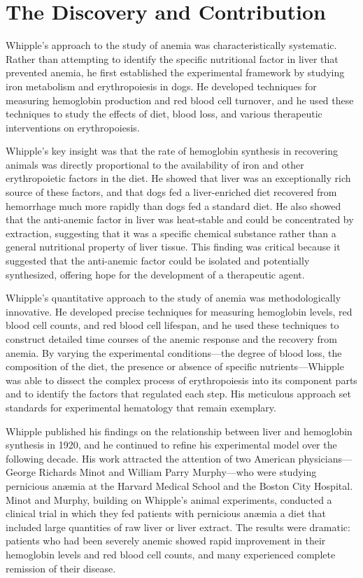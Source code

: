 \section{The Discovery and Contribution}

Whipple's approach to the study of anemia was characteristically systematic. Rather than attempting to identify the specific nutritional factor in liver that prevented anemia, he first established the experimental framework by studying iron metabolism and erythropoiesis in dogs. He developed techniques for measuring hemoglobin production and red blood cell turnover, and he used these techniques to study the effects of diet, blood loss, and various therapeutic interventions on erythropoiesis.

Whipple's key insight was that the rate of hemoglobin synthesis in recovering animals was directly proportional to the availability of iron and other erythropoietic factors in the diet. He showed that liver was an exceptionally rich source of these factors, and that dogs fed a liver-enriched diet recovered from hemorrhage much more rapidly than dogs fed a standard diet. He also showed that the anti-anemic factor in liver was heat-stable and could be concentrated by extraction, suggesting that it was a specific chemical substance rather than a general nutritional property of liver tissue. This finding was critical because it suggested that the anti-anemic factor could be isolated and potentially synthesized, offering hope for the development of a therapeutic agent.

Whipple's quantitative approach to the study of anemia was methodologically innovative. He developed precise techniques for measuring hemoglobin levels, red blood cell counts, and red blood cell lifespan, and he used these techniques to construct detailed time courses of the anemic response and the recovery from anemia. By varying the experimental conditions---the degree of blood loss, the composition of the diet, the presence or absence of specific nutrients---Whipple was able to dissect the complex process of erythropoiesis into its component parts and to identify the factors that regulated each step. His meticulous approach set standards for experimental hematology that remain exemplary.

Whipple published his findings on the relationship between liver and hemoglobin synthesis in 1920, and he continued to refine his experimental model over the following decade. His work attracted the attention of two American physicians---George Richards Minot and William Parry Murphy---who were studying pernicious an{\ae}mia at the Harvard Medical School and the Boston City Hospital. Minot and Murphy, building on Whipple's animal experiments, conducted a clinical trial in which they fed patients with pernicious an{\ae}mia a diet that included large quantities of raw liver or liver extract. The results were dramatic: patients who had been severely anemic showed rapid improvement in their hemoglobin levels and red blood cell counts, and many experienced complete remission of their disease.

